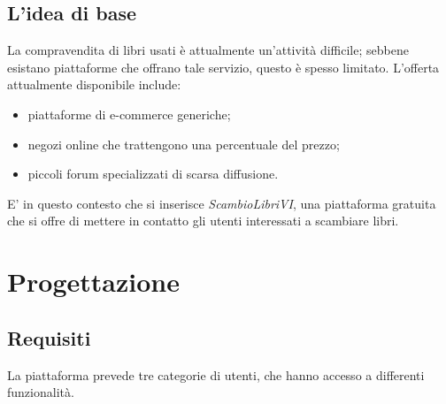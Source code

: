 \documentclass[openany,10pt,a4paper]{article}
\begin{document}
	\subsection{L'idea di base}
	La compravendita di libri usati è attualmente un'attività difficile; sebbene esistano piattaforme che offrano tale servizio, questo è spesso limitato. L'offerta attualmente disponibile include:
	\begin{itemize}
		\item piattaforme di e-commerce generiche;
		\item negozi online che trattengono una percentuale del prezzo;
		\item piccoli forum specializzati di scarsa diffusione.
	\end{itemize}
	E' in questo contesto che si inserisce \textit{ScambioLibriVI}, una piattaforma gratuita che si offre di mettere in contatto gli utenti interessati a scambiare libri.
\section{Progettazione}
	\subsection{Requisiti}
		La piattaforma prevede tre categorie di utenti, che hanno accesso a differenti funzionalità.
\end{document}
